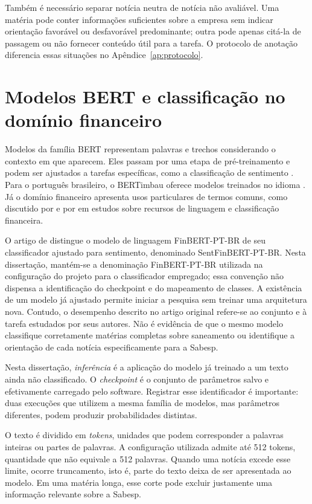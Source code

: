 Também é necessário separar notícia neutra de notícia não avaliável. Uma matéria pode conter informações suficientes sobre a empresa sem indicar orientação favorável ou desfavorável predominante; outra pode apenas citá-la de passagem ou não fornecer conteúdo útil para a tarefa. O protocolo de anotação diferencia essas situações no Apêndice~\ref{ap:protocolo}.

\section{Modelos BERT e classificação no domínio financeiro}

Modelos da família BERT representam palavras e trechos considerando o contexto em que aparecem. Eles passam por uma etapa de pré-treinamento e podem ser ajustados a tarefas específicas, como a classificação de sentimento \cite{devlin2019bert}. Para o português brasileiro, o BERTimbau oferece modelos treinados no idioma \cite{souza2020bertimbau}. Já o domínio financeiro apresenta usos particulares de termos comuns, como discutido por  e por  em estudos sobre recursos de linguagem e classificação financeira.

O artigo de  distingue o modelo de linguagem FinBERT-PT-BR de seu classificador ajustado para sentimento, denominado SentFinBERT-PT-BR. Nesta dissertação, mantém-se a denominação FinBERT-PT-BR utilizada na configuração do projeto para o classificador empregado; essa convenção não dispensa a identificação do checkpoint e do mapeamento de classes. A existência de um modelo já ajustado permite iniciar a pesquisa sem treinar uma arquitetura nova. Contudo, o desempenho descrito no artigo original refere-se ao conjunto e à tarefa estudados por seus autores. Não é evidência de que o mesmo modelo classifique corretamente matérias completas sobre saneamento ou identifique a orientação de cada notícia especificamente para a Sabesp.

Nesta dissertação, \emph{inferência} é a aplicação do modelo já treinado a um texto ainda não classificado. O \emph{checkpoint} é o conjunto de parâmetros salvo e efetivamente carregado pelo software. Registrar esse identificador é importante: duas execuções que utilizem a mesma família de modelos, mas parâmetros diferentes, podem produzir probabilidades distintas.

O texto é dividido em \emph{tokens}, unidades que podem corresponder a palavras inteiras ou partes de palavras. A configuração utilizada admite até 512 tokens, quantidade que não equivale a 512 palavras. Quando uma notícia excede esse limite, ocorre truncamento, isto é, parte do texto deixa de ser apresentada ao modelo. Em uma matéria longa, esse corte pode excluir justamente uma informação relevante sobre a Sabesp.


